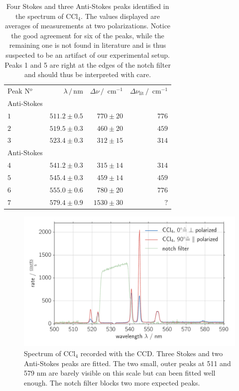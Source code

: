 \begin{table}[htpb]
    \centering
    \caption{
        Four Stokes and three Anti-Stokes peaks identified in the spectrum of CCl$_4$. The values displayed 
        are averages of measurements at two polarizations. Notice the good agreement for six of the peaks, 
        while the remaining one is not found in literature and is thus suspected to be an artifact of our 
        experimental setup. Peaks 1 and 5 are right at the edges of the notch filter and should thus be 
        interpreted with care. 
        }
    \label{tab:ccl4_peaks}
    \begin{tabular}{l r r r}
        \rowcolor{LightCyan} Peak N$^o$ & $\lambda \, / \, \text{nm}$ &
        $\Delta \nu \, / \, \text{ cm}^{-1}$ & 
        $\Delta \nu_\text{lit} \, / \, \text{ cm}^{-1}$ \\
        \cellcolor{LightCyan}Anti-Stokes &&& \\
        \cellcolor{LightCyan}$1$ & $511.2 \pm 0.5$ & $770 \pm 20$ & $776$   \\
        \cellcolor{LightCyan}$2$ & $519.5 \pm 0.3$ & $460 \pm 20$ & $459$   \\
        \cellcolor{LightCyan}$3$ & $523.4 \pm 0.3$ & $312 \pm 15$ & $314$   \\
        \cellcolor{LightCyan}Anti-Stokes &&& \\
        \cellcolor{LightCyan}$4$ & $541.2 \pm 0.3$ & $315 \pm 14$ & $314$   \\
        \cellcolor{LightCyan}$5$ & $545.4 \pm 0.3$ & $459 \pm 14$ & $459$   \\
        \cellcolor{LightCyan}$6$ & $555.0 \pm 0.6$ & $780 \pm 20$ & $776$   \\
        \cellcolor{LightCyan}$7$ & $579.4 \pm 0.9$ & $1530 \pm 30$ & $?$   
    \end{tabular}
\end{table}

\begin{figure}[htpb]
    \centering
    \includegraphics[width=0.8\linewidth]{analysis/figures/ccd_ccl4_spectra}
    \caption{
        Spectrum of CCl$_4$ recorded with the CCD. Three Stokes and two Anti-Stokes peaks are fitted. The two 
        small, outer peaks at 511 and 579 nm are barely visible on this scale but can been fitted well enough. 
        The notch filter blocks two more expected peaks. 
    }
    \label{fig:ccd_ccl4_spectra}
\end{figure}

